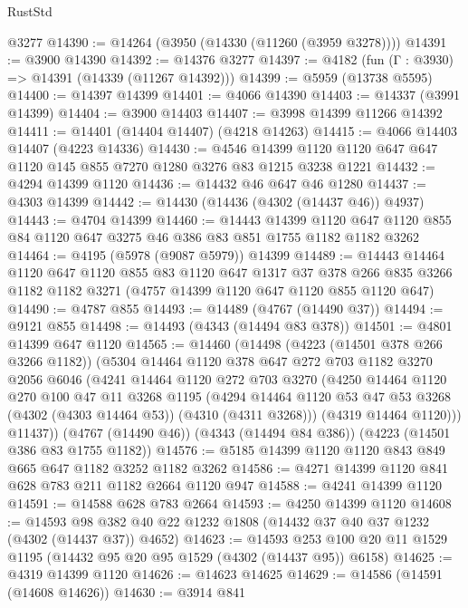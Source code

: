 \begin{lexlean}{RustStd}
\begin{coremodule}
    @3277
@14390 := @14264 (@3950 (@14330 (@11260 (@3959 @3278))))
@14391 := @3900 @14390
@14392 := @14376 @3277
@14397 := @4182 (fun (Γ : @3930) => @14391 (@14339 (@11267 @14392)))
@14399 := @5959 (@13738 @5595)
@14400 := @14397 @14399
@14401 := @4066 @14390
@14403 := @14337 (@3991 @14399)
@14404 := @3900 @14403
@14407 := @3998 @14399 @11266 @14392
@14411 := @14401 (@14404 @14407) (@4218 @14263)
@14415 := @4066 @14403 @14407 (@4223 @14336)
@14430 := @4546 @14399 @1120 @1120 @647 @647 @1120 @145 @855 @7270 @1280 @3276 @83 @1215 @3238 @1221
@14432 := @4294 @14399 @1120
@14436 := @14432 @46 @647 @46 @1280
@14437 := @4303 @14399
@14442 := @14430 (@14436 (@4302 (@14437 @46)) @4937)
@14443 := @4704 @14399
@14460 := @14443
    @14399
    @1120
    @647
    @1120
    @855
    @84
    @1120
    @647
    @3275
    @46
    @386
    @83
    @851
    @1755
    @1182
    @1182
    @3262
@14464 := @4195 (@5978 (@9087 @5979)) @14399
@14489 := @14443
    @14464
    @1120
    @647
    @1120
    @855
    @83
    @1120
    @647
    @1317
    @37
    @378
    @266
    @835
    @3266
    @1182
    @1182
    @3271
    (@4757 @14399 @1120 @647 @1120 @855 @1120 @647)
@14490 := @4787 @855
@14493 := @14489 (@4767 (@14490 @37))
@14494 := @9121 @855
@14498 := @14493 (@4343 (@14494 @83 @378))
@14501 := @4801 @14399 @647 @1120
@14565 := @14460
    (@14498
      (@4223 (@14501 @378 @266 @3266 @1182))
      (@5304
        @14464
        @1120
        @378
        @647
        @272
        @703
        @1182
        @3270
        @2056
        @6046
        (@4241
          @14464
          @1120
          @272
          @703
          @3270
          (@4250
            @14464
            @1120
            @270
            @100
            @47
            @11
            @3268
            @1195
            (@4294 @14464 @1120 @53 @47 @53 @3268 (@4302 (@4303 @14464 @53)) (@4310 (@4311 @3268)))
            (@4319 @14464 @1120)))
        @11437))
    (@4767 (@14490 @46))
    (@4343 (@14494 @84 @386))
    (@4223 (@14501 @386 @83 @1755 @1182))
@14576 := @5185 @14399 @1120 @1120 @843 @849 @665 @647 @1182 @3252 @1182 @3262
@14586 := @4271 @14399 @1120 @841 @628 @783 @211 @1182 @2664 @1120 @947
@14588 := @4241 @14399 @1120
@14591 := @14588 @628 @783 @2664
@14593 := @4250 @14399 @1120
@14608 := @14593 @98 @382 @40 @22 @1232 @1808 (@14432 @37 @40 @37 @1232 (@4302 (@14437 @37)) @4652)
@14623 := @14593 @253 @100 @20 @11 @1529 @1195 (@14432 @95 @20 @95 @1529 (@4302 (@14437 @95)) @6158)
@14625 := @4319 @14399 @1120
@14626 := @14623 @14625
@14629 := @14586 (@14591 (@14608 @14626))
@14630 := @3914 @841

\end{coremodule}
\end{lexlean}
